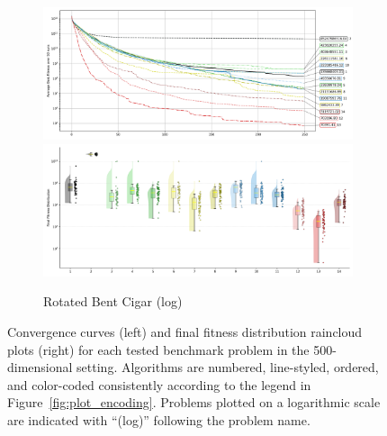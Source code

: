 \begin{figure}[p]
\begin{subfigure}{1\textwidth}
    \centering
    \includegraphics[width=.49\textwidth]{Figures/results/500/Rotated_Bent_Cigar_All_selected_algorithms_dim500_annot_legend.png}
    \includegraphics[width=.49\textwidth]{Figures/results/500/Rotated_Bent_Cigar_all_dim500_raincloud_vertical.png}
    \caption{Rotated Bent Cigar (log)}
\end{subfigure}


\captionsetup{list=no}
\caption[Convergence curves and final fitness distribution raincloud plots for 500-dimensional problems]{Convergence curves (left) and final fitness distribution raincloud plots (right) for each tested benchmark problem in the 500-dimensional setting. Algorithms are numbered, line-styled, ordered, and color-coded consistently according to the legend in Figure~\ref{fig:plot_encoding}. Problems plotted on a logarithmic scale are indicated with ``(log)'' following the problem name.}
\end{figure}





